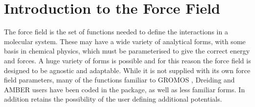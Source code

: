\section{Introduction to the \D Force Field}

The force field is the set of functions needed
to define the interactions in a molecular system.  These may have
a wide variety of analytical forms, with some basis in chemical
physics, which must be parameterised to give the correct energy
and forces.  A huge variety of forms is possible and for this
reason the \D force field is designed
to be agnostic and adaptable.  While it is not supplied with its
own force field parameters, many of the functions
familiar to GROMOS 
\cite{gunsteren-87a}, Dreiding  \cite{mayo-90a} and AMBER
 \cite{weiner-86a} users have been coded
in the package, as well as less familiar forms.  In addition \D
retains the possibility of the user defining additional
potentials.


